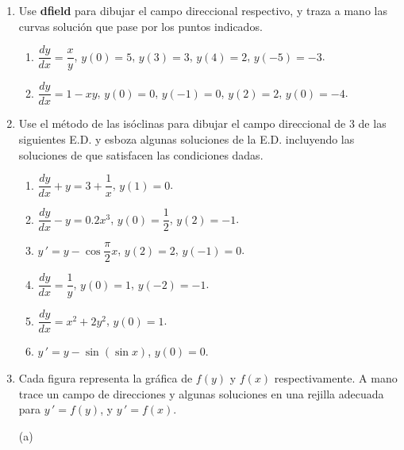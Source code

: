 \documentclass[letterpaper,10pt]{memoir}
\begin{document}
	
\titulo

\begin{enumerate}
	\item Use \textbf{dfield} para dibujar el campo direccional respectivo, y traza a mano las curvas solución que pase por los puntos indicados.
		\begin{enumerate}
			\item \(\dfrac{dy}{dx} = \dfrac{x}{y}\), \(y(0) =5\), \(y(3) =3\), \(y(4) =2\), \(y(-5) =-3\).
			\item \(\dfrac{dy}{dx} =1-xy\), \(y(0) =0\), \(y(-1) =0\), \(y(2) =2\), \(y(0) =-4\).
		\end{enumerate}
	\item Use el método de las isóclinas para dibujar el campo direccional de 3 de las siguientes E.D. y esboza algunas soluciones de la E.D. incluyendo las soluciones de que satisfacen las condiciones dadas.\\[2mm]
		\begin{minipage}{0.5\linewidth}
			\begin{enumerate}
				\item \(\dfrac{dy}{dx}+y=3+ \dfrac{1}{x}\), \(y(1) =0\).
				\item \(\dfrac{dy}{dx} -y=0.2x^3\), \(y(0) = \dfrac{1}{2}\), \(y(2) =-1\).
				\item \(y \,' =y- \cos \dfrac{\pi}{2} x\), \(y(2) =2\), \(y(-1) =0\).
			\end{enumerate}
		\end{minipage}\hspace{5mm}
		\begin{minipage}{0.5\linewidth}
			\begin{enumerate}
			\setcounter{enumii}{3}
			\item \(\dfrac{dy}{dx} = \dfrac{1}{y}\), \(y(0) =1\), \(y(-2) =-1\).
			\item \(\dfrac{dy}{dx} =x^2+2y^2\), \(y(0) =1\).
			\item \(y \,' =y- \sin (\sin x)\), \(y(0) =0\).
			\end{enumerate}
		\end{minipage}
	\item Cada figura representa la gráfica de \(f(y)\) y \(f(x)\) respectivamente. A mano trace un campo de direcciones y algunas soluciones en una rejilla adecuada para \(y \,' =f(y)\), y \(y \,' =f(x)\). \\[2mm]
		\begin{minipage}{0.5\linewidth}
			(a)\\

\end{minipage}
\end{enumerate}
\end{document}
